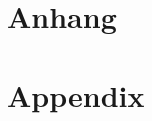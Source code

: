 %
%
\begin{appendix}
{\chapter*{Anhang}\label{sec:Anhang}
	\setcounter{chapter}{1}
}{}
{\chapter*{Appendix}\label{sec:appendix}
	\setcounter{chapter}{1}
}{}



\end{appendix}
